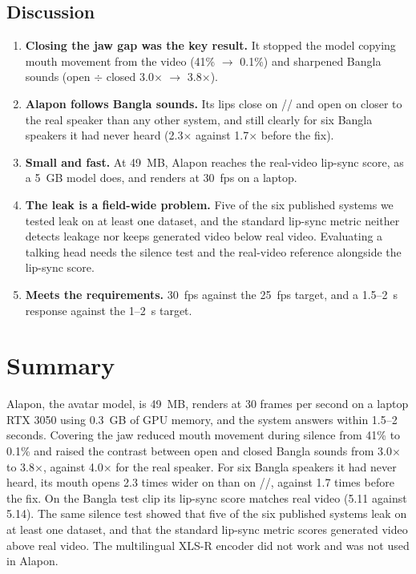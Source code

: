 \subsection*{Discussion}

\begin{enumerate}
    \item \textbf{Closing the jaw gap was the key result.} It stopped the model copying mouth movement from the video (41\% $\rightarrow$ 0.1\%) and sharpened Bangla sounds (open $\div$ closed 3.0$\times$ $\rightarrow$ 3.8$\times$).
    \item \textbf{Alapon follows Bangla sounds.} Its lips close on // and open on  closer to the real speaker than any other system, and still clearly for six Bangla speakers it had never heard (2.3$\times$ against 1.7$\times$ before the fix).
    \item \textbf{Small and fast.} At 49~MB, Alapon reaches the real-video lip-sync score, as a 5~GB model does, and renders at 30~fps on a laptop.
    \item \textbf{The leak is a field-wide problem.} Five of the six published systems we tested leak on at least one dataset, and the standard lip-sync metric neither detects leakage nor keeps generated video below real video. Evaluating a talking head needs the silence test and the real-video reference alongside the lip-sync score.
    \item \textbf{Meets the requirements.} 30~fps against the 25~fps target, and a 1.5--2~s response against the 1--2~s target.
\end{enumerate}

\section{Summary}

Alapon, the avatar model, is 49~MB, renders at 30 frames per second on a laptop RTX 3050 using 0.3~GB of GPU memory, and the system answers within 1.5--2 seconds. Covering the jaw reduced mouth movement during silence from 41\% to 0.1\% and raised the contrast between open and closed Bangla sounds from 3.0$\times$ to 3.8$\times$, against 4.0$\times$ for the real speaker. For six Bangla speakers it had never heard, its mouth opens 2.3 times wider on  than on //, against 1.7 times before the fix. On the Bangla test clip its lip-sync score matches real video (5.11 against 5.14). The same silence test showed that five of the six published systems leak on at least one dataset, and that the standard lip-sync metric scores generated video above real video. The multilingual XLS-R encoder did not work and was not used in Alapon.
